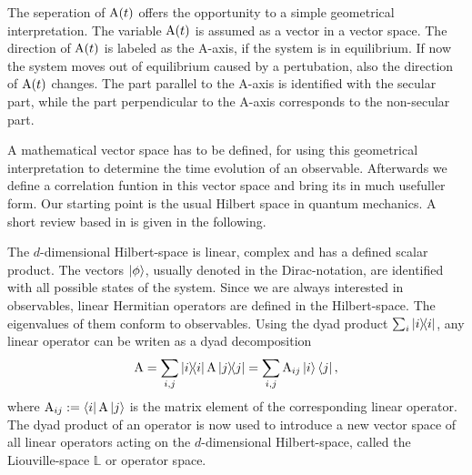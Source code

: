 The seperation of $\mathrm{A}(t)$ offers the opportunity to a simple geometrical interpretation.
The variable $\mathrm{A}(t)$ is assumed as a vector in a vector space.
The direction of $\mathrm{A}(t)$ is labeled as the A-axis, if the system is in equilibrium.
If now the system moves out of equilibrium caused by a pertubation, also the direction of $\mathrm{A}(t)$ changes.
The part parallel to the A-axis is identified with the secular part, while the part perpendicular to the A-axis corresponds to the non-secular part.

A mathematical vector space has to be defined, for using this geometrical interpretation to determine the time evolution of an observable.
Afterwards we define a correlation funtion in this vector space and bring its in much usefuller form.
Our starting point is the usual Hilbert space in quantum mechanics.
A short review based in \cite{Audretsch} is given in the following.

The $d$-dimensional Hilbert-space is linear, complex and has a defined scalar product.
The vectors $\ket{\phi}$, usually denoted in the Dirac-notation, are identified with all possible states of the system.
Since we are always interested in observables, linear Hermitian operators are defined in the Hilbert-space.
The eigenvalues of them conform to observables.
Using the dyad product $\sum_{i} \dyad{i}{i}$, any linear operator can be writen as a dyad decomposition
%
\begin{align}
	\mt{A} = \sum\limits_{i,j} \dyad{i}{i} \mt{A} \dyad{j}{j} = \sum\limits_{i,j} \mt{A}_{ij} \ket{i} \bra{j},
	\label{eq:dyad product}
\end{align}
%
where $\mathrm{A}_{ij} := \bra{i}\mathrm{A}\ket{j}$ is the matrix element of the corresponding linear operator.
The dyad product of an operator is now used to introduce a new vector space of all linear operators acting on the $d$-dimensional Hilbert-space, called the Liouville-space $\mathbb{L}$ or operator space.

